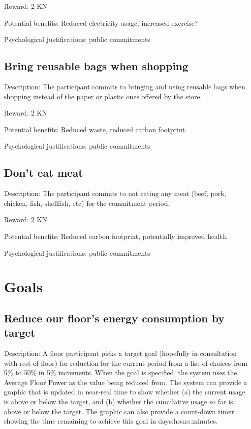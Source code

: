 Reward: 2 KN

Potential benefits: Reduced electricity usage, increased exercise?

Psychological justifications: public commitments

\subsection{Bring reusable bags when shopping}

Description: The participant commits to bringing and using reusable bags when shopping instead of the paper or plastic ones offered by the store.

Reward: 2 KN

Potential benefits: Reduced waste, reduced carbon footprint.

Psychological justifications: public commitments

\subsection{Don't eat meat}

Description: The participant commits to not eating any meat (beef, pork, chicken, fish, shellfish, etc) for the commitment period.

Reward: 2 KN

Potential benefits: Reduced carbon footprint, potentially improved health.

Psychological justifications: public commitments


\section{Goals}
\label{sec:goal-list}

\subsection{Reduce our floor's energy consumption by {target} }
\label{sec:goal-reduce-energy}

Description: A floor participant picks a target goal (hopefully in consultation with rest of floor) for reduction for the current period from a list of choices from 5\% to 50\% in 5\% increments.  When the goal is specified, the system uses the Average Floor Power as the value being reduced from.  The system can provide a graphic that is updated in near-real time to show whether (a) the current usage is above or below the target, and (b) whether the cumulative usage so far is above or below the target.  The graphic can also provide a count-down timer showing the time remaining to achieve this goal in days:hours:minutes.

